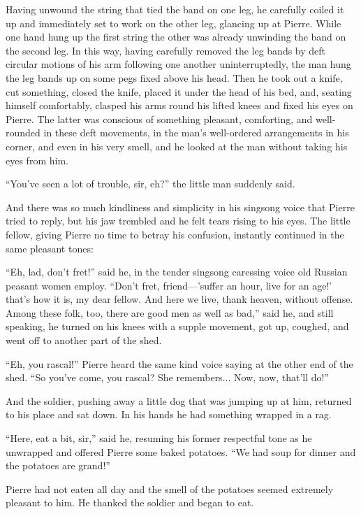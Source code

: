 Having unwound the string that tied the band on one leg, he
carefully coiled it up and immediately set to work on the other
leg, glancing up at Pierre. While one hand hung up the first
string the other was already unwinding the band on the second
leg. In this way, having carefully removed the leg bands by deft
circular motions of his arm following one another
uninterruptedly, the man hung the leg bands up on some pegs fixed
above his head. Then he took out a knife, cut something, closed
the knife, placed it under the head of his bed, and, seating
himself comfortably, clasped his arms round his lifted knees and
fixed his eyes on Pierre. The latter was conscious of something
pleasant, comforting, and well-rounded in these deft movements,
in the man's well-ordered arrangements in his corner, and even in
his very smell, and he looked at the man without taking his eyes
from him.

``You've seen a lot of trouble, sir, eh?'' the little man
suddenly said.

And there was so much kindliness and simplicity in his singsong
voice that Pierre tried to reply, but his jaw trembled and he
felt tears rising to his eyes. The little fellow, giving Pierre
no time to betray his confusion, instantly continued in the same
pleasant tones:

``Eh, lad, don't fret!'' said he, in the tender singsong
caressing voice old Russian peasant women employ. ``Don't fret,
friend---'suffer an hour, live for an age!' that's how it is, my
dear fellow. And here we live, thank heaven, without
offense. Among these folk, too, there are good men as well as
bad,'' said he, and still speaking, he turned on his knees with a
supple movement, got up, coughed, and went off to another part of
the shed.

``Eh, you rascal!'' Pierre heard the same kind voice saying at
the other end of the shed. ``So you've come, you rascal? She
remembers... Now, now, that'll do!''

And the soldier, pushing away a little dog that was jumping up at
him, returned to his place and sat down. In his hands he had
something wrapped in a rag.

``Here, eat a bit, sir,'' said he, resuming his former respectful
tone as he unwrapped and offered Pierre some baked potatoes. ``We
had soup for dinner and the potatoes are grand!''

Pierre had not eaten all day and the smell of the potatoes seemed
extremely pleasant to him. He thanked the soldier and began to
eat.

